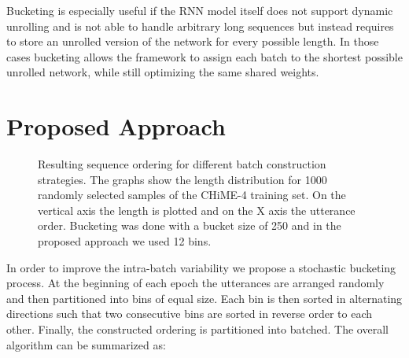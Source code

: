 \documentclass{article}
\begin{document}
  Bucketing is especially useful if the RNN model itself does not support dynamic unrolling and 
  is not able to handle arbitrary 
  long sequences but instead requires to store an unrolled version of the network for every possible 
  length. In those cases bucketing allows the framework to assign each batch to the shortest possible 
  unrolled network, while still optimizing the same shared weights.

  \section{Proposed Approach} \label{sec:approach}
  
  \begin{figure}
   	\caption{Resulting sequence ordering for different batch construction strategies. The graphs 
   	show the length distribution for 1000 randomly selected samples of the CHiME-4 training set. On the 
   	vertical axis the length is plotted and on the X axis the utterance order. Bucketing was done with a bucket size of 250 and in the proposed approach we used 12 bins.}
   	  \label{fig:plot}
   \end{figure}
  
  In order to improve the intra-batch variability we propose a stochastic bucketing process. At the beginning
  of each epoch the utterances are arranged randomly and then partitioned into bins of equal size. Each bin
  is then sorted in alternating directions such that two consecutive bins are sorted in reverse order to each 
  other. Finally, the constructed ordering is partitioned into batched. The overall algorithm can be summarized as: \\[1ex]
 
\end{document}
